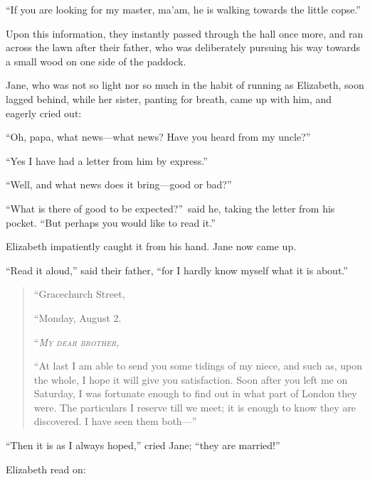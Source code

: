 \documentclass[12pt,english]{book}
\newcommand{\noun}[1]{\textsc{#1}}
\begin{document}
{}``If you are looking for my master, ma'am, he is walking towards
the little copse.''

Upon this information, they instantly passed through the hall once
more, and ran across the lawn after their father, who was deliberately
pursuing his way towards a small wood on one side of the paddock.

Jane, who was not so light nor so much in the habit of running as
Elizabeth, soon lagged behind, while her sister, panting for breath,
came up with him, and eagerly cried out:

{}``Oh, papa, what news\mbox{---}what news? Have you heard from
my uncle?''\ 

{}``Yes I have had a letter from him by express.''

{}``Well, and what news does it bring\mbox{---}good or bad?''\ 

{}``What is there of good to be expected?''\ said he, taking the
letter from his pocket. {}``But perhaps you would like to read it.''

Elizabeth impatiently caught it from his hand. Jane now came up.

{}``Read it aloud,'' said their father, {}``for I hardly know myself
what it is about.''

\begin{quotation}
``Gracechurch Street,\nopagebreak[4]

``Monday, August 2.\nopagebreak[4]

\noindent {}``\textit{\emph{\noun{My}}} \textit{\emph{\noun{dear}}}
\textit{\emph{\noun{brother}}}\emph{\noun{,}}\nopagebreak[4]

{}``At last I am able to send you some tidings of my niece, and such
as, upon the whole, I hope it will give you satisfaction. Soon after
you left me on Saturday, I was fortunate enough to find out in what
part of London they were. The particulars I reserve till we meet;
it is enough to know they are discovered. I have seen them both\mbox{---}'' 
\end{quotation}
\hspace{0.25in}{}``Then it is as I always hoped,'' cried Jane;
{}``they are married!''\ 

Elizabeth read on:
\end{document}
